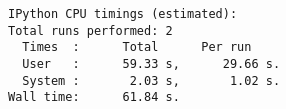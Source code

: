 \begin{Code}[scale=0.75,htbp!]
    \centering
\begin{lstlisting}[caption=Timing of a typical run of the code,
label=listing:time]
IPython CPU timings (estimated):
Total runs performed: 2
  Times  :      Total      Per run
  User   :      59.33 s,      29.66 s.
  System :       2.03 s,       1.02 s.
Wall time:      61.84 s.
\end{lstlisting}
\end{Code}














%
%
%
%
%
